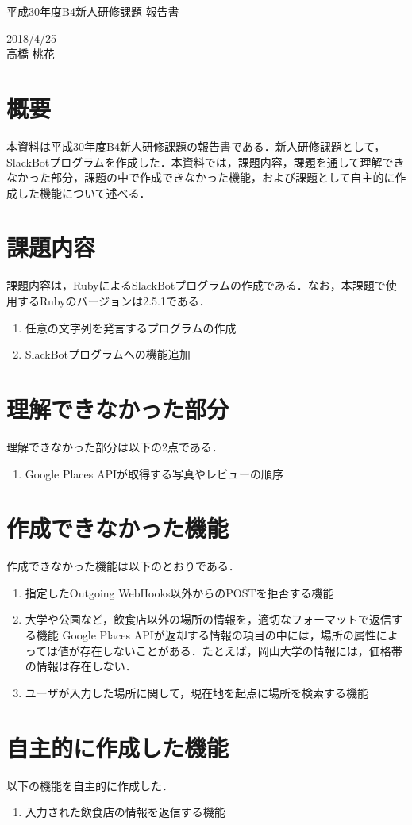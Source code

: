 \documentclass[12pt]{jsarticle}
\begin{document}
\begin{center}
{\LARGE 平成30年度B4新人研修課題 報告書}
\end{center}

\begin{flushright}
  2018/4/25\\
  高橋 桃花
\end{flushright}
\section{概要}
\label{sec:introduction}
本資料は平成30年度B4新人研修課題の報告書である．新人研修課題として，SlackBotプログラムを作成した．本資料では，課題内容，課題を通して理解できなかった部分，課題の中で作成できなかった機能，および課題として自主的に作成した機能について述べる．

\section{課題内容}
課題内容は，RubyによるSlackBotプログラムの作成である．なお，本課題で使用するRubyのバージョンは2.5.1である．
\begin{enumerate}
\item 任意の文字列を発言するプログラムの作成
\item SlackBotプログラムへの機能追加
\end{enumerate}

\section{理解できなかった部分}
理解できなかった部分は以下の2点である．

\begin{enumerate}
\item Google Places APIが取得する写真やレビューの順序
\end{enumerate}

\section{作成できなかった機能}
作成できなかった機能は以下のとおりである．

\begin{enumerate}
\item 指定したOutgoing WebHooks以外からのPOSTを拒否する機能
\item 大学や公園など，飲食店以外の場所の情報を，適切なフォーマットで返信する機能
  Google Places APIが返却する情報の項目の中には，場所の属性によっては値が存在しないことがある．たとえば，岡山大学の情報には，価格帯の情報は存在しない．
\item ユーザが入力した場所に関して，現在地を起点に場所を検索する機能
\end{enumerate}

\section{自主的に作成した機能}
以下の機能を自主的に作成した．
\begin{enumerate}
  \item 入力された飲食店の情報を返信する機能
\end{enumerate}
\end{document}
